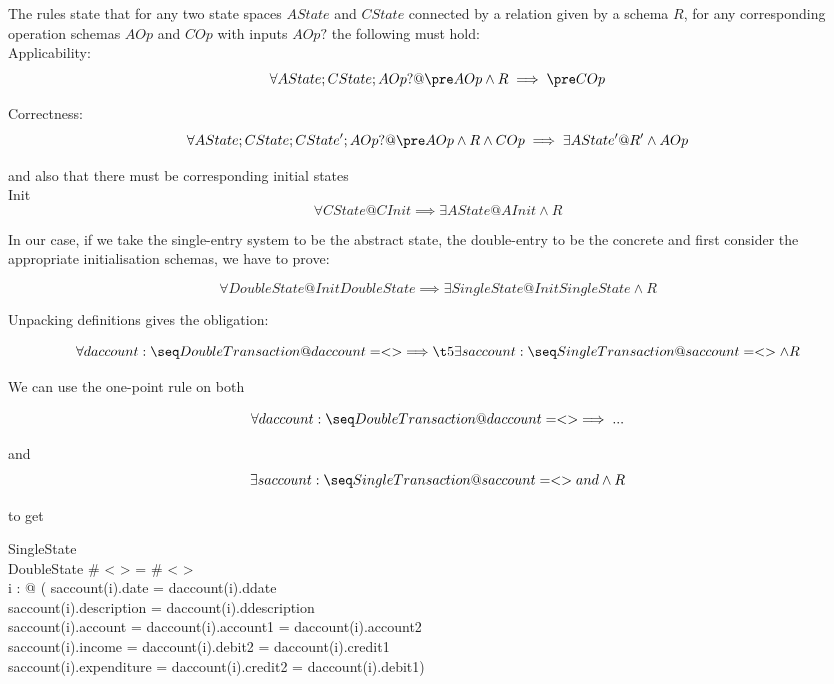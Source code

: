 \documentclass[11pt]{amsart}
\begin{document}
The rules state that for any two state spaces $AState$ and $CState$ connected by a relation given by a schema $R$, for any corresponding operation schemas $AOp$ and $COp$ with inputs $AOp?$ the following must hold:\\

\noindent Applicability:
\[
\forall AState; CState; AOp? @ \pre AOp \land R \implies \pre COp
\]

\noindent Correctness:
\[
\forall AState; CState; CState'; AOp? @ \pre AOp \land R \land COp \implies \exists AState' @ R' \land AOp
\]

\noindent and also that there must be corresponding initial states\\

\noindent Init
\[
\forall CState @ CInit \implies \exists AState @ AInit \land R
\]

In our case, if we take the single-entry system to be the abstract state, the double-entry to be the concrete and first consider the appropriate initialisation schemas, we have to prove:

\[
\forall DoubleState  @ InitDoubleState \implies \exists SingleState  @ InitSingleState \land R
\]

Unpacking definitions gives the obligation:

\[
\forall daccount : \seq DoubleTransaction @ daccount = < > \implies\\
\t5 \exists saccount : \seq SingleTransaction @ saccount = < >  \land R
\]

We can use the one-point rule on both

\[
\forall daccount : \seq DoubleTransaction @ daccount = < > \implies...
\]

and
\[
\exists saccount : \seq SingleTransaction @ saccount = < > and \land R
\]

to get

\begin{schema}{}
SingleState\\
DoubleState
\where
\# < > = \# < >\\
\forall i : \dom < > @ (
saccount(i).date = daccount(i).ddate \land\\
saccount(i).description = daccount(i).ddescription \land\\
saccount(i).account = daccount(i).account1 = daccount(i).account2 \land\\
saccount(i).income = daccount(i).debit2  = daccount(i).credit1 \land\\
saccount(i).expenditure = daccount(i).credit2 = daccount(i).debit1)
\end{schema}
\end{document}
